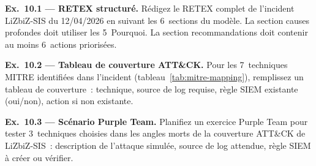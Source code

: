 \begin{boxexo}
\textbf{Ex.~10.1 — RETEX structuré.}
Rédigez le RETEX complet de l'incident LiZbiZ-SIS du 12/04/2026
en suivant les 6~sections du modèle. La section causes profondes
doit utiliser les 5~Pourquoi. La section recommandations doit
contenir au moins 6~actions priorisées.

\medskip\textbf{Ex.~10.2 — Tableau de couverture ATT\&CK.}
Pour les 7~techniques MITRE identifiées dans l'incident
(tableau~\ref{tab:mitre-mapping}), remplissez un tableau de couverture~:
technique, source de log requise, règle SIEM existante (oui/non),
action si non existante.

\medskip\textbf{Ex.~10.3 — Scénario Purple Team.}
Planifiez un exercice Purple Team pour tester 3~techniques choisies
dans les angles morts de la couverture ATT\&CK de LiZbiZ-SIS~:
description de l'attaque simulée, source de log attendue, règle SIEM
à créer ou vérifier.
\end{boxexo}
